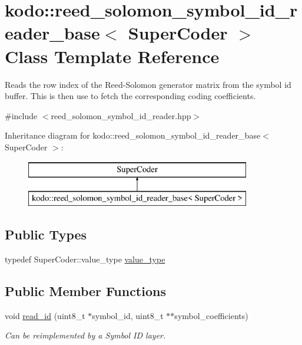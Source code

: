 \hypertarget{classkodo_1_1reed__solomon__symbol__id__reader__base}{\section{kodo\-:\-:reed\-\_\-solomon\-\_\-symbol\-\_\-id\-\_\-reader\-\_\-base$<$ Super\-Coder $>$ Class Template Reference}
\label{classkodo_1_1reed__solomon__symbol__id__reader__base}
}


Reads the row index of the Reed-\/\-Solomon generator matrix from the symbol id buffer. This is then use to fetch the corresponding coding coefficients.  




{\ttfamily \#include $<$reed\-\_\-solomon\-\_\-symbol\-\_\-id\-\_\-reader.\-hpp$>$}

Inheritance diagram for kodo\-:\-:reed\-\_\-solomon\-\_\-symbol\-\_\-id\-\_\-reader\-\_\-base$<$ Super\-Coder $>$\-:\begin{figure}[H]
\begin{center}
\leavevmode
\includegraphics[height=2.000000cm]{classkodo_1_1reed__solomon__symbol__id__reader__base}
\end{center}
\end{figure}
\subsection*{Public Types}
\begin{DoxyCompactItemize}
\item 
typedef Super\-Coder\-::value\-\_\-type \hyperlink{classkodo_1_1reed__solomon__symbol__id__reader__base_aae5efe4cddfb83d9a895a95f44572d83}{value\-\_\-type}
\begin{DoxyCompactList}\small\item\em \end{DoxyCompactList}\end{DoxyCompactItemize}
\subsection*{Public Member Functions}
\begin{DoxyCompactItemize}
\item 
void \hyperlink{classkodo_1_1reed__solomon__symbol__id__reader__base_a61b56c5372ab77caad96d41e386834cf}{read\-\_\-id} (uint8\-\_\-t $\ast$symbol\-\_\-id, uint8\-\_\-t $\ast$$\ast$symbol\-\_\-coefficients)
\begin{DoxyCompactList}\small\item\em Can be reimplemented by a Symbol I\-D layer. \end{DoxyCompactList}\end{DoxyCompactItemize}


